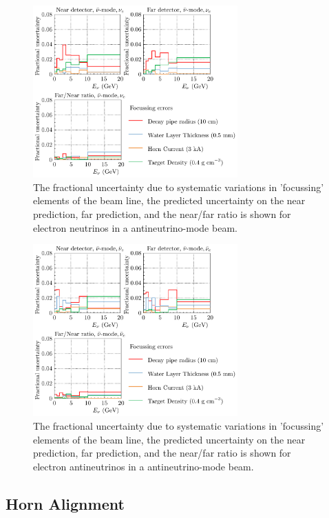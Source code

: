 \documentclass{article}
\begin{document}
\begin{figure}
  \centering
  \includegraphics[width=0.7\textwidth]{plots/fracerrs/nubarmode_nue_Focussing}
  \caption{The fractional uncertainty due to systematic variations in 'focussing' elements of the beam line, the predicted uncertainty on the near prediction, far prediction, and the near/far ratio is shown for electron neutrinos in a antineutrino-mode beam.}
  \label{fig:foc_nubar_nue}
\end{figure}

\begin{figure}
  \centering
  \includegraphics[width=0.7\textwidth]{plots/fracerrs/nubarmode_nuebar_Focussing}
  \caption{The fractional uncertainty due to systematic variations in 'focussing' elements of the beam line, the predicted uncertainty on the near prediction, far prediction, and the near/far ratio is shown for electron antineutrinos in a antineutrino-mode beam.}
  \label{fig:foc_nubar_nuebar}
\end{figure}

\subsection{Horn Alignment}
\end{document}
